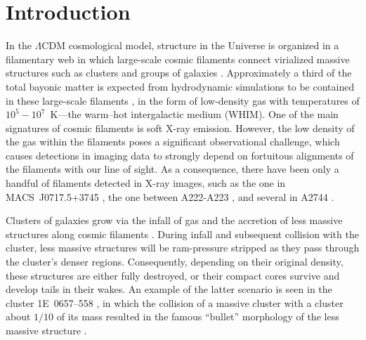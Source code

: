 \section{Introduction}

In the $\Lambda$CDM cosmological model, structure in the Universe is organized in a filamentary web in which large-scale cosmic filaments connect virialized massive structures such as clusters and groups of galaxies \citep[e.g., ][]{Einasto1994}. Approximately a third of the total bayonic matter is expected from hydrodynamic simulations to be contained in these large-scale filaments \citep[e.g.][]{Dave2001}, in the form of low-density gas with temperatures of $10^5-10^7$~K---the warm--hot intergalactic medium (WHIM). One of the main signatures of cosmic filaments is soft X-ray emission. However, the low density of the gas within the filaments poses a significant observational challenge, which causes detections in imaging data to strongly depend on fortuitous alignments of the filaments with our line of sight. As a consequence, there have been only a handful of filaments detected in X-ray images, such as the one in MACS~J0717.5+3745 \citep{Ebeling2004}, the one between A222-A223 \citep{Dietrich2005, Werner2008, Dietrich2012}, and several in A2744 \citep{Eckert2015}.

Clusters of galaxies grow via the infall of gas and the accretion of less massive structures along cosmic filaments \citep[e.g.,][]{Springel2006}. During infall and subsequent collision with the cluster, less massive structures will be ram-pressure stripped as they pass through the cluster's denser regions. Consequently, depending on their original density, these structures are either fully destroyed, or their compact cores survive and develop tails in their wakes. An example of the latter scenario is seen in the cluster 1E~0657--558 \citep{Elvis1992}, in which the collision of a massive cluster with a cluster about $1/10$ of its mass \citep{Springel2007, Mastropietro2008} resulted in the famous ``bullet'' morphology of the less massive structure \citep{Markevitch2002}.

